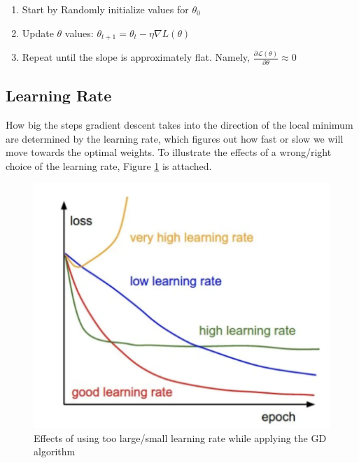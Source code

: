 \documentclass{article}
\begin{document}
\begin{enumerate}
\item Start by Randomly initialize values for $\theta_{0}$
	\item Update $\theta$ values: $\theta_{t+1}=\theta_{t}-\eta\nabla L(\theta)$
	\item Repeat until the slope is approximately flat. Namely,
	      $\frac{\partial\mathcal{L}(\theta)}{\partial\theta}\approx 0$
\end{enumerate}

\subsection{Learning Rate}
How big the steps gradient descent takes into the direction of the local minimum are determined by the
learning rate, which figures out how fast or slow we will move towards the optimal weights. To illustrate
the effects of a wrong/right choice of the learning rate, Figure \ref{fig:lr} is attached.

\begin{figure}[h!]
	\centering
	\includegraphics[scale=0.75]{figure.png}
	\caption{Effects of using too large/small learning rate while applying the GD algorithm}
	\label{fig:lr}
\end{figure}
\end{document}
